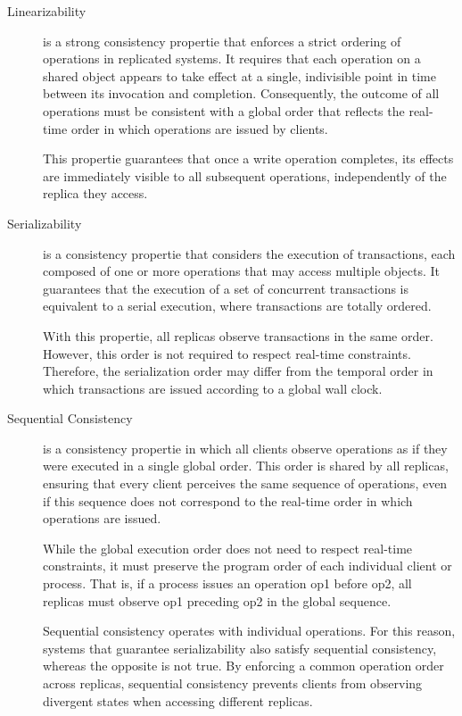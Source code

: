\begin{description}
    \item[Linearizability] is a strong consistency propertie that enforces a strict ordering of operations in replicated systems. It requires that each operation on a shared object appears to take effect at a single, indivisible point in time between its invocation and completion. Consequently, the outcome of all operations must be consistent with a global order that reflects the real-time order in which operations are issued by clients.

          This propertie guarantees that once a write operation completes, its effects are immediately visible to all subsequent operations, independently of the replica they access.
    \item[Serializability] is a consistency propertie that considers the execution of transactions, each composed of one or more operations that may access multiple objects. It guarantees that the execution of a set of concurrent transactions is equivalent to a serial execution, where transactions are totally ordered.

          With this propertie, all replicas observe transactions in the same order. However, this order is not required to respect real-time constraints. Therefore, the serialization order may differ from the temporal order in which transactions are issued according to a global wall clock.
    \item[Sequential Consistency] is a consistency propertie in which all clients observe operations as if they were executed in a single global order. This order is shared by all replicas, ensuring that every client perceives the same sequence of operations, even if this sequence does not correspond to the real-time order in which operations are issued.

          While the global execution order does not need to respect real-time constraints, it must preserve the program order of each individual client or process. That is, if a process issues an operation op1 before op2, all replicas must observe op1 preceding op2 in the global sequence.

          Sequential consistency operates with individual operations. For this reason, systems that guarantee serializability also satisfy sequential consistency, whereas the opposite is not true. By enforcing a common operation order across replicas, sequential consistency prevents clients from observing divergent states when accessing different replicas.
\end{description}

